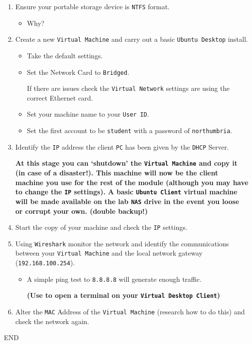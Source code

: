 \documentclass[11pt]{article}
\begin{document}
\begin{enumerate}
    \item Ensure your portable storage device is \texttt{NTFS} format.
    \begin{itemize}
        \item Why?
    \end{itemize} 
    \item Create a new \texttt{Virtual Machine} and carry out a basic \texttt{Ubuntu Desktop} install.
        \begin{itemize}
            \item Take the default settings.
            \item Set the Network Card to \texttt{Bridged}.
            \begin{tcolorbox}[title={\textbf{Note:}}]
                If there are issues check the \texttt{Virtual Network} settings are using the correct Ethernet card.
            \end{tcolorbox}
            \item Set your machine name to your \texttt{User ID}.    
            \item Set the first account to be \texttt{student} with a password of \texttt{northumbria}.    
        \end{itemize}
    \item Identify the \texttt{IP} address the client \texttt{PC} has been given by the \texttt{DHCP} Server.
    \begin{tcolorbox}[colback=blue!20]
        \textbf{At this stage you can `shutdown' the \texttt{Virtual Machine} and copy it (in case of a disaster!). This machine will now be the client machine you use for the rest of the module (although you may have to change the \texttt{IP} settings). A basic \texttt{Ubuntu Client} virtual machine will be made available on the lab \texttt{NAS} drive in the event you loose or corrupt your own. (double backup!)}
    \end{tcolorbox}
    \item Start the copy of your machine and check the \texttt{IP} settings.
    \item Using \texttt{Wireshark} monitor the network and identify the communications between your \texttt{Virtual Machine} and the local network gateway (\texttt{192.168.100.254}).
        \begin{itemize}
            \item A simple ping test to \texttt{8.8.8.8} will generate enough traffic. 
            \begin{tcolorbox}[colback=blue!20]
                \textbf{(Use  to open a terminal on your \texttt{Virtual Desktop Client})}
            \end{tcolorbox}
        \end{itemize}
    \item Alter the \texttt{MAC} Address of the \texttt{Virtual Machine} (research how to do this) and check the network again.
\end{enumerate}
END
\end{document}
